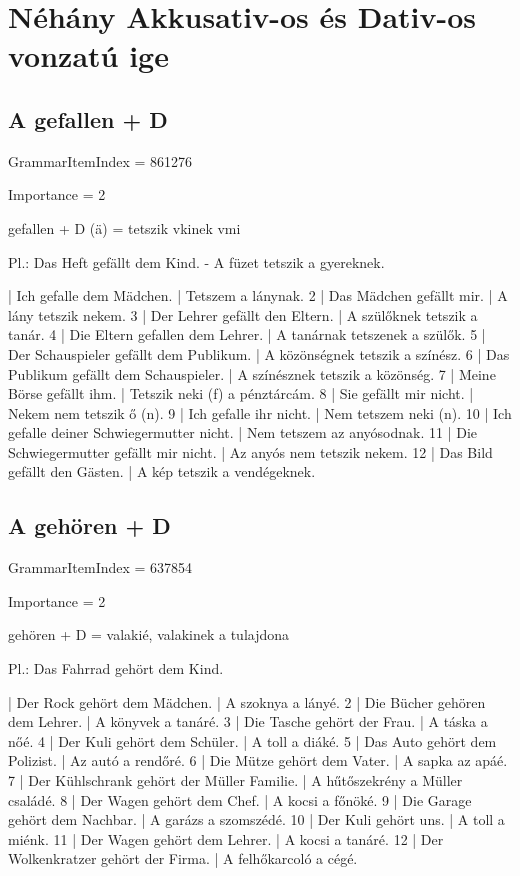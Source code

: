 \documentclass{article}
\newenvironment{desc}{\verbatim}{\endverbatim}
\newenvironment{exmp}{\verbatim}{\endverbatim}
\begin{document}
\section{Néhány Akkusativ-os és Dativ-os vonzatú ige}

\subsection{A gefallen + D}

GrammarItemIndex = 861276

Importance = 2

\begin{desc}
gefallen + D (ä) = tetszik vkinek vmi

Pl.: Das Heft gefällt dem Kind. - A füzet tetszik a gyereknek.
\end{desc}

\begin{exmp}
1 | Ich gefalle dem Mädchen. | Tetszem a lánynak.
2 | Das Mädchen gefällt mir. | A lány tetszik nekem.
3 | Der Lehrer gefällt den Eltern. | A szülőknek tetszik a tanár.
4 | Die Eltern gefallen dem Lehrer. | A tanárnak tetszenek a szülők.
5 | Der Schauspieler gefällt dem Publikum. | A közönségnek tetszik a színész.
6 | Das Publikum gefällt dem Schauspieler. | A színésznek tetszik a közönség.
7 | Meine Börse gefällt ihm. | Tetszik neki (f) a pénztárcám.
8 | Sie gefällt mir nicht. | Nekem nem tetszik ő (n).
9 | Ich gefalle ihr nicht. | Nem tetszem neki (n).
10 | Ich gefalle deiner Schwiegermutter nicht. | Nem tetszem az anyósodnak.
11 | Die Schwiegermutter gefällt mir nicht. | Az anyós nem tetszik nekem.
12 | Das Bild gefällt den Gästen. | A kép tetszik a vendégeknek.
\end{exmp}

\subsection{A gehören + D}

GrammarItemIndex = 637854

Importance = 2

\begin{desc}
gehören + D = valakié, valakinek a tulajdona

Pl.: Das Fahrrad gehört dem Kind.
\end{desc}

\begin{exmp}
1 | Der Rock gehört dem Mädchen. | A szoknya a lányé.
2 | Die Bücher gehören dem Lehrer. | A könyvek a tanáré.
3 | Die Tasche gehört der Frau. | A táska a nőé.
4 | Der Kuli gehört dem Schüler. | A toll a diáké.
5 | Das Auto gehört dem Polizist. | Az autó a rendőré.
6 | Die Mütze gehört dem Vater. | A sapka az apáé.
7 | Der Kühlschrank gehört der Müller Familie. | A hűtőszekrény a Müller családé.
8 | Der Wagen gehört dem Chef. | A kocsi a főnöké.
9 | Die Garage gehört dem Nachbar. | A garázs a szomszédé.
10 | Der Kuli gehört uns. | A toll a miénk.
11 | Der Wagen gehört dem Lehrer. | A kocsi a tanáré.
12 | Der Wolkenkratzer gehört der Firma. | A felhőkarcoló a cégé.
\end{exmp}
\end{document}
